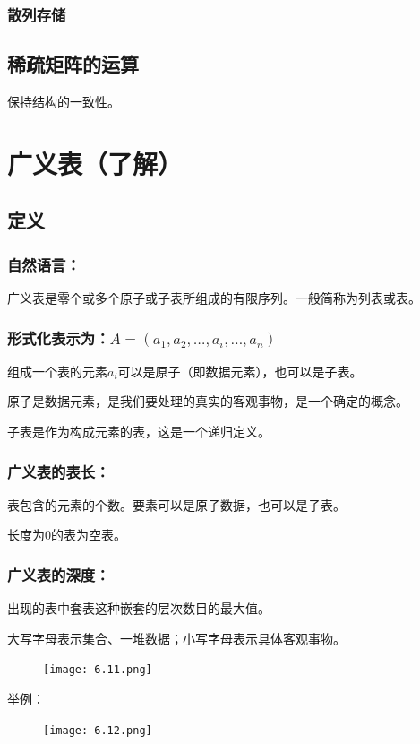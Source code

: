 \documentclass[AutoFakeBold]{LZUThesis2007}
\begin{document}
			\subsubsection{散列存储}
		\subsection{稀疏矩阵的运算}
保持结构的一致性。
	\section{广义表（了解）}
		\subsection{定义}
			\subsubsection{自然语言：}
广义表是零个或多个原子或子表所组成的有限序列。一般简称为列表或表。

			\subsubsection{形式化表示为：$A=\left(a_{1}, a_{2}, \dots, a_{i}, \dots, a_{n}\right)$}
组成一个表的元素$a_{i}$可以是原子（即数据元素），也可以是子表。

原子是数据元素，是我们要处理的真实的客观事物，是一个确定的概念。
		
子表是作为构成元素的表，这是一个递归定义。

			\subsubsection{广义表的表长：}
表包含的元素的个数。要素可以是原子数据，也可以是子表。

长度为0的表为空表。
			\subsubsection{广义表的深度：}
出现的表中套表这种嵌套的层次数目的最大值。

大写字母表示集合、一堆数据；小写字母表示具体客观事物。
\begin{figure}[H]
    \centering
    \texttt{[image: 6.11.png]}
    \label{fig_install_texlive}
\end{figure}
举例：
\begin{figure}[H]
    \centering
    \texttt{[image: 6.12.png]}
    \label{fig_install_texlive}
\end{figure}
\end{document}
